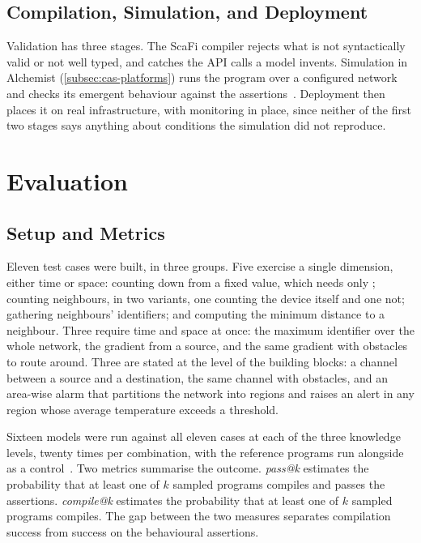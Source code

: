 \subsection{Compilation, Simulation, and Deployment}
\label{subsec:llm-validation}

Validation has three stages.
%
The ScaFi compiler rejects what is not syntactically valid or not well typed,
and catches the API calls a model invents.
%
Simulation in Alchemist (\cref{subsec:cas-platforms}) runs the program over a configured network and checks its emergent behaviour against the assertions~\cite{DBLP:journals/jos/PianiniMV13}.
%
Deployment then places it on real infrastructure, with monitoring in place,
since neither of the first two stages says anything about conditions the simulation did not reproduce.

\section{Evaluation}
\label{sec:llm-evaluation}

\subsection{Setup and Metrics}
\label{subsec:llm-setup}

Eleven test cases were built, in three groups.
%
Five exercise a single dimension, either time or space:
counting down from a fixed value, which needs only ;
counting neighbours, in two variants, one counting the device itself and one not;
gathering neighbours' identifiers;
and computing the minimum distance to a neighbour.
%
Three require time and space at once:
the maximum identifier over the whole network,
the gradient from a source,
and the same gradient with obstacles to route around.
%
Three are stated at the level of the building blocks:
a channel between a source and a destination,
the same channel with obstacles,
and an area-wise alarm that partitions the network into regions and raises an alert in any region whose average temperature exceeds a threshold.

Sixteen models were run against all eleven cases at each of the three knowledge levels,
twenty times per combination,
with the reference programs run alongside as a control~\cite{DBLP:journals/tiot/AguzziFV25}.
%
Two metrics summarise the outcome.
%
\emph{pass@k} estimates the probability that at least one of $k$ sampled programs compiles and passes the assertions.
%
\emph{compile@k} estimates the probability that at least one of $k$ sampled programs compiles.
The gap between the two measures separates compilation success from success on the behavioural assertions.

